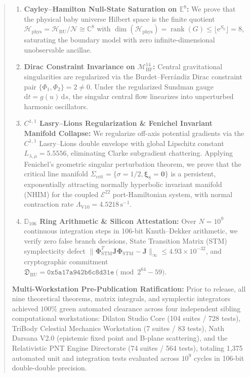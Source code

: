 \documentclass[11pt,a4paper,reqno]{article}
\theoremstyle{plain}
\theoremstyle{definition}
\theoremstyle{remark}
\numberwithin{equation}{section}
\providecommand{\diff}{\mathrm{d}}
\begin{document}
\begin{abstract}
\begin{enumerate}[label=\textbf{(\roman*)}, leftmargin=2.2em]
  \item \textbf{Cayley--Hamilton Null-State Saturation on $\mathbb{E}^8$:} We prove that the physical baby universe Hilbert space is the finite quotient $\mathcal{H}_{\mathrm{phys}} = \mathcal{H}_{\mathrm{BU}}/\mathcal{N} \cong \mathbb{C}^8$ with $\dim(\mathcal{H}_{\mathrm{phys}}) = \operatorname{rank}(G) \le \lfloor \mathrm{e}^{S_0} \rfloor = 8$, saturating the boundary model with zero infinite-dimensional unobservable ancillae.
  \item \textbf{Dirac Constraint Invariance on $\mathcal{M}_{\mathrm{BF}}^{14}$:} Central gravitational singularities are regularized via the Burdet--Ferr\'{a}ndiz Dirac constraint pair $\{\Phi_1, \Phi_2\} = 2 \ne 0$. Under the regularized Sundman gauge $\diff t = g(u)\,\diff s$, the singular central flow linearizes into unperturbed harmonic oscillators.
  \item \textbf{$C^{1,1}$ Lasry--Lions Regularization \& Fenichel Invariant Manifold Collapse:} We regularize off-axis potential gradients via the $C^{1,1}$ Lasry--Lions double envelope with global Lipschitz constant $L_{\lambda,\mu} = 5.5556$, eliminating Clarke subgradient chattering. Applying Fenichel's geometric singular perturbation theorem, we prove that the critical line manifold $\Sigma_{\mathrm{crit}} = \{ \sigma = 1/2, \bm{\xi}_8 = \mathbf{0} \}$ is a persistent, exponentially attracting normally hyperbolic invariant manifold (NHIM) for the coupled $\mathcal{E}^{22}$ port-Hamiltonian system, with normal contraction rate $\Lambda_{\mathrm{V10}} = 4.5218\,\mathrm{s}^{-1}$.
  \item \textbf{$\mathbb{D}_{106}$ Ring Arithmetic \& Silicon Attestation:} Over $N = 10^9$ continuous integration steps in 106-bit Knuth--Dekker arithmetic, we verify zero false branch decisions, State Transition Matrix (STM) symplecticity defect $\|\bm{\Phi}_{\mathrm{STM}}^T \mathbf{J} \bm{\Phi}_{\mathrm{STM}} - \mathbf{J}\|_\infty \le 4.93 \times 10^{-32}$, and cryptographic commitment $\mathfrak{D}_{\mathrm{BU}} = \mathtt{0x5a17a942b6c8d31e} \pmod{2^{64}-59}$.
\end{enumerate}

\noindent
\textbf{Multi-Workstation Pre-Publication Ratification:} Prior to release, all nine theoretical theorems, matrix integrals, and symplectic integrators achieved $100\%$ green automated clearance across four independent sibling computational workstations: Dilaton Studio Core (104 suites / 728 tests), TriBody Celestial Mechanics Workstation (7 suites / 83 tests), Nath Darsana V2.0 (epistemic fixed point and B-plane scattering), and the Relativistic PNT Engine Directorate (74 suites / 564 tests), totaling 1,375 automated unit and integration tests evaluated across $10^9$ cycles in 106-bit double-double precision.
\end{abstract}
\end{document}

